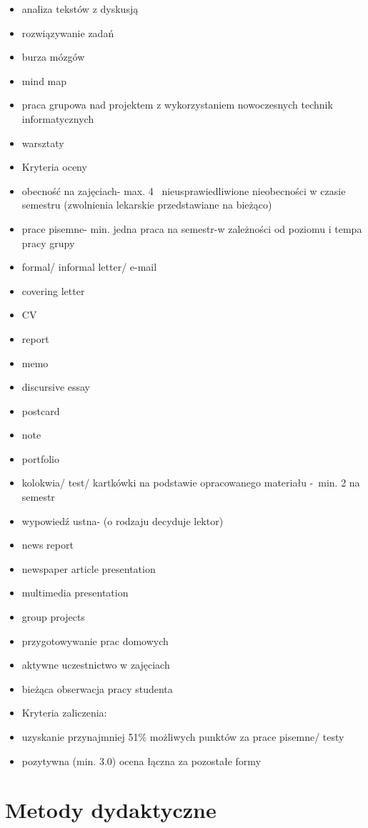 \documentclass[12pt, a4paper]{article}
\begin{document}
\begin{itemize}
  \item analiza tekstów z dyskusją
  \item rozwiązywanie zadań
  \item burza mózgów
  \item mind map
  \item praca grupowa nad projektem z wykorzystaniem nowoczesnych technik informatycznych
  \item warsztaty
  \item Kryteria oceny
  \item obecność na zajęciach- max. 4  nieusprawiedliwione nieobecności w czasie semestru (zwolnienia lekarskie przedstawiane na bieżąco)
  \item prace pisemne- min. jedna praca na semestr-w zależności od poziomu i tempa pracy grupy
  \item formal/ informal letter/ e-mail
  \item covering letter
  \item CV
  \item report
  \item memo
  \item discursive essay
  \item postcard
  \item note
  \item portfolio
  \item kolokwia/ test/ kartkówki na podstawie opracowanego materiału - min. 2 na semestr
  \item wypowiedź ustna- (o rodzaju decyduje lektor)
  \item news report
  \item newspaper article presentation
  \item multimedia presentation
  \item group projects
  \item przygotowywanie prac domowych
  \item aktywne uczestnictwo w zajęciach
  \item bieżąca obserwacja pracy studenta
  \item Kryteria zaliczenia:
  \item uzyskanie przynajmniej 51\% możliwych punktów za prace pisemne/ testy
  \item pozytywna (min. 3.0) ocena łączna za pozostałe formy
\end{itemize}

\section{Metody dydaktyczne}
\end{document}
